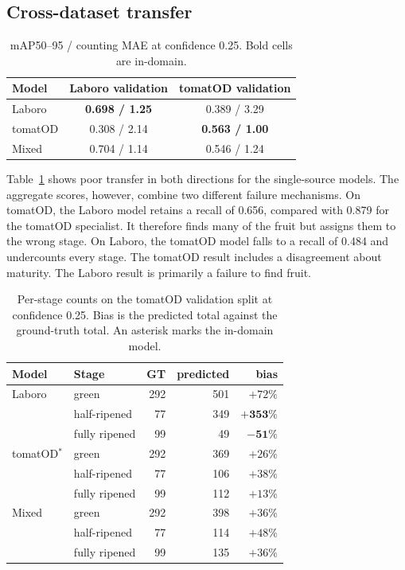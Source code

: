\subsection{Cross-dataset transfer}
\label{sec:annotation}

\begin{table}[t]
\caption{mAP50--95 / counting MAE at confidence 0.25. Bold cells are in-domain.}
\label{tab:cross}
\centering
\begin{tabular}{lcc}
\toprule
Model & Laboro validation & tomatOD validation \\
\midrule
Laboro & \textbf{0.698 / 1.25} & 0.389 / 3.29 \\
tomatOD & 0.308 / 2.14 & \textbf{0.563 / 1.00} \\
Mixed & 0.704 / 1.14 & 0.546 / 1.24 \\
\bottomrule
\end{tabular}
\end{table}

Table~\ref{tab:cross} shows poor transfer in both directions for the
single-source models. The aggregate scores, however, combine two different
failure mechanisms. On tomatOD, the Laboro model retains a recall of 0.656,
compared with 0.879 for the tomatOD specialist. It therefore finds many of the
fruit but assigns them to the wrong stage. On Laboro, the tomatOD model falls to
a recall of 0.484 and undercounts every stage. The tomatOD result includes a
disagreement about maturity. The Laboro result is primarily a failure to find
fruit.

\begin{table}[t]
\caption{Per-stage counts on the tomatOD validation split at confidence 0.25.
Bias is the predicted total against the ground-truth total. An asterisk marks
the in-domain model.}
\label{tab:cross-stage}
\centering
\begin{tabular}{llrrr}
\toprule
Model & Stage & GT & predicted & bias \\
\midrule
Laboro   & green & 292 & 501 & $+72\%$ \\
         & half-ripened & 77 & 349 & $\mathbf{+353\%}$ \\
         & fully ripened & 99 & 49 & $\mathbf{-51\%}$ \\
\midrule
tomatOD$^{*}$ & green & 292 & 369 & $+26\%$ \\
         & half-ripened & 77 & 106 & $+38\%$ \\
         & fully ripened & 99 & 112 & $+13\%$ \\
\midrule
Mixed    & green & 292 & 398 & $+36\%$ \\
         & half-ripened & 77 & 114 & $+48\%$ \\
         & fully ripened & 99 & 135 & $+36\%$ \\
\bottomrule
\end{tabular}
\end{table}

